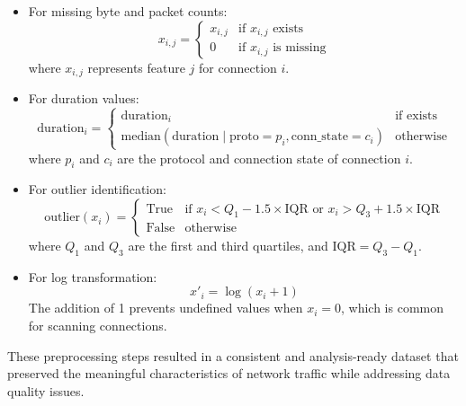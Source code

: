 \begin{itemize}
    \item For missing byte and packet counts:
    \begin{equation}
        x_{i,j} = 
        \begin{cases}
            x_{i,j} & \text{if } x_{i,j} \text{ exists} \\
            0 & \text{if } x_{i,j} \text{ is missing}
        \end{cases}
    \end{equation}
    where $x_{i,j}$ represents feature $j$ for connection $i$.
    
    \item For duration values:
    \begin{equation}
        \text{duration}_{i} = 
        \begin{cases}
            \text{duration}_{i} & \text{if exists} \\
            \text{median}(\text{duration} \mid \text{proto}=p_i, \text{conn\_state}=c_i) & \text{otherwise}
        \end{cases}
    \end{equation}
    where $p_i$ and $c_i$ are the protocol and connection state of connection $i$.
    
    \item For outlier identification:
    \begin{equation}
        \text{outlier}(x_i) = 
        \begin{cases}
            \text{True} & \text{if } x_i < Q_1 - 1.5 \times \text{IQR} \text{ or } x_i > Q_3 + 1.5 \times \text{IQR} \\
            \text{False} & \text{otherwise}
        \end{cases}
    \end{equation}
    where $Q_1$ and $Q_3$ are the first and third quartiles, and $\text{IQR} = Q_3 - Q_1$.
    
    \item For log transformation:
    \begin{equation}
        x'_i = \log(x_i + 1)
    \end{equation}
    The addition of 1 prevents undefined values when $x_i = 0$, which is common for scanning connections.
\end{itemize}

These preprocessing steps resulted in a consistent and analysis-ready dataset that preserved the meaningful characteristics of network traffic while addressing data quality issues.

